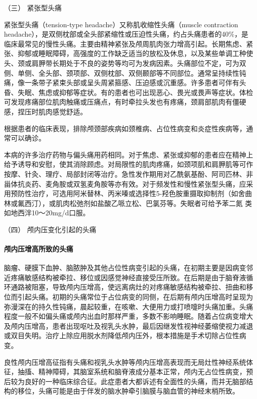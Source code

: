 \hypertarget{text00020.htmlux5cux23CHP1-7-4-3}{}
（三） 紧张型头痛

紧张型头痛（tension-type headache）又称肌收缩性头痛（muscle contraction
headache），是双侧枕部或全头部紧缩性或压迫性头痛，约占头痛患者的40\%，是临床最常见的慢性头痛。主要由精神紧张及颅周肌肉张力增高引起。长期焦虑、紧张、抑郁或睡眠障碍，高强度的工作缺乏适当的放松及休息，以及某些单调工种使头、颈或肩胛带长期处于不良的姿势等均可为发病因素。头痛部位不定，可为双侧、单侧、全头部、颈项部、双侧枕部、双侧颞部等不同部位。通常呈持续性钝痛，像一条带子紧束头部或呈头周紧箍感、压迫感或沉重感。许多患者可伴有头昏、失眠、焦虑或抑郁等症状。有的患者也可出现恶心、畏光或畏声等症状。体检可发现疼痛部位肌肉触痛或压痛点，有时牵拉头发也有疼痛，颈肩部肌肉有僵硬感，捏压时肌肉感觉舒适。

根据患者的临床表现，排除颅颈部疾病如颈椎病、占位性病变和炎症性疾病等，通常可以确诊。

本病的许多治疗药物与偏头痛用药相同。对于焦虑、紧张或抑郁的患者应在精神上给予诱导和安慰，使其消除顾虑。对局限性的肌肉疼痛，如颈项肌和肩胛肌等可作按摩、针灸、理疗、局部封闭等治疗。急性发作期用对乙酰氨基酚、阿司匹林、非甾体抗炎药、麦角胺或双氢麦角胺等亦有效。对于频发性和慢性紧张型头痛，应采用预防性治疗，可选用阿米替林、丙米嗪或选择性5-羟色胺重摄取抑制剂（如舍曲林或氟西汀），或肌肉松弛剂如盐酸乙哌立松、巴氯芬等。失眠者可给予苯二氮{}
类如地西泮10～20mg/d口服。

\hypertarget{text00020.htmlux5cux23CHP1-7-4-4}{}
（四） 颅内压变化引起的头痛

\paragraph{颅内压增高所致的头痛}

脑瘤、硬膜下血肿、脑脓肿及其他占位性病变引起的头痛，在初期主要是因病变邻近疼痛敏感结构被牵拉、移位或因感觉神经直接受压所致。在后期是由于脑脊液循环通路被阻塞，导致颅内压增高，使远离病灶的对疼痛敏感结构被牵拉、扭曲和移位而引起头痛。初期的头痛常位于占位病变的同侧，在后期有颅内压增高时呈现为弥漫深在的持久性钝痛，晨起较重，在咳嗽、大便用力或打喷嚏时头痛加重。头痛程度一般不如偏头痛或颅内出血时那样严重，多数不影响睡眠。随着占位病变增大及颅内压增高，患者出现呕吐及视乳头水肿，最后因继发性视神经萎缩使视力减退或双目失明。治疗上除应用脱水剂降低颅内压外，根本措施是手术切除占位性病变。

良性颅内压增高征指有头痛和视乳头水肿等颅内压增高表现而无局灶性神经系统体征，抽搐、精神障碍，其脑室系统和脑脊液成分基本正常，颅内无占位性病变，预后较为良好的一种临床综合征。此症患者大都诉述有全面性的头痛，而并无脑部结构的移位，头痛可能是由于伴发的脑水肿牵引脑膜与脑血管的神经末梢所致。

